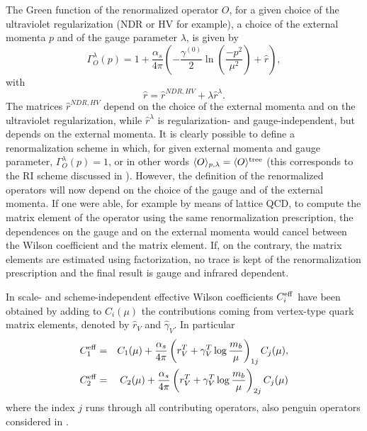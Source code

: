 The Green function of the renormalized operator $O$,
for a given choice of the ultraviolet regularization (NDR or HV for example), 
a choice of the external momenta $p$ and of the gauge parameter $\lambda$, 
is given by 
\begin{equation}
  \label{eq:matel}
  \Gamma_O^\lambda (p) = 1 + \frac{\alpha_s}{4 \pi} 
\left(-\frac{\gamma^{(0)}}{2}
  \ln(\frac{-p^2}{\mu^2}) + \hat{r} \right),
\end{equation}
with
\begin{equation}
\hat{r}= \hat r^{NDR,HV} + \lambda \hat r^\lambda.
\label{eq:rral}
\end{equation}
The matrices $\hat r^{NDR,HV}$ depend on the choice of the external momenta and
on the ultraviolet regularization, while $\hat r^\lambda$ is 
regularization- and
gauge-independent, but depends on the external momenta. 
It is clearly possible to define a renormalization scheme in which, 
for given external momenta and gauge parameter, $\Gamma_O^\lambda (p)
= 1$, or in other words $\langle O \rangle_{p,\lambda}=\langle O
\rangle^{\rm tree}$ (this corresponds to the RI scheme discussed in
\cite{rome2}). However, the definition of the renormalized 
operators will now depend on the choice of the gauge and of the
external momenta. If one were able, for example by means of lattice
QCD, to compute the matrix element of the operator using the same
renormalization prescription, the dependences on the gauge and on the
external momenta would cancel between the Wilson coefficient and the
matrix element. If, on the contrary, the matrix elements are estimated
using factorization, no trace is kept of the renormalization
prescription and the final result is gauge and infrared dependent. 

In  \cite{GNF,AKL98} scale- and scheme-independent effective
Wilson coefficients $C_i^{\rm eff}$ 
have been obtained by adding to $C_i(\mu)$ the
contributions coming from vertex-type quark matrix elements, denoted
by $\hat r_V$ and $\hat\gamma_V$. In particular
\begin{eqnarray}
  \label{eq:cali}
  C_1^{\rm eff}&=& 
C_1(\mu) + \frac{\alpha_s}{4 \pi}\left( r_V^T + \gamma_V^T
  \log \frac{m_b}{\mu}\right)_{1j} C_j(\mu),\nonumber \\
  C_2^{\rm eff}&=& 
C_2(\mu)  + \frac{\alpha_s}{4 \pi}\left( r_V^T + \gamma_V^T
  \log \frac{m_b}{\mu}\right)_{2j} C_j(\mu)
\end{eqnarray}
where the index $j$ runs through all contributing operators, also
penguin operators considered in \cite{Cheng,GNF,AKL98}.

